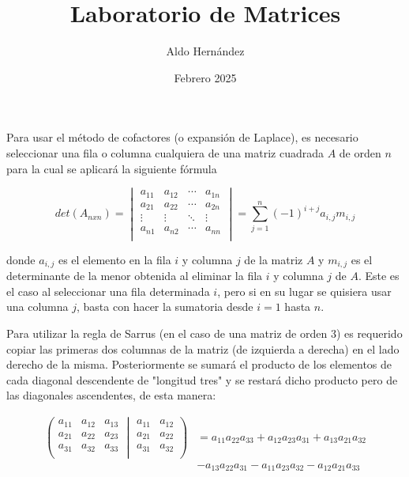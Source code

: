\documentclass[12pt, letterpaper]{article}
\title{Laboratorio de Matrices}
\author{Aldo Hernández}
\date{Febrero 2025}
\begin{document}
\maketitle

Para usar el método de cofactores (o expansión de Laplace), es necesario seleccionar una fila o columna cualquiera de una matriz cuadrada $A$ de orden $n$ para la cual se aplicará la siguiente fórmula

\begin{equation*}
    det(A_{nxn})
    =
    \begin{vmatrix}
        a_{11} & a_{12} & \cdots & a_{1n} \\
        a_{21} & a_{22} & \cdots & a_{2n} \\
        \vdots & \vdots & \ddots & \vdots \\
        a_{n1} & a_{n2} & \cdots & a_{nn} \\
    \end{vmatrix}
    =
    \sum_{j=1}^{n}(-1)^{i+j}a_{i,j}m_{i,j}
\end{equation*}

donde $a_{i,j}$ es el elemento en la fila $i$ y columna $j$ de la matriz $A$ y $m_{i,j}$ es el determinante de la menor obtenida al eliminar la fila $i$ y columna $j$ de $A$. Este es el caso al seleccionar una fila determinada $i$, pero si en su lugar se quisiera usar una columna $j$, basta con hacer la sumatoria desde $i=1$ hasta $n$.

\vspace{5mm}

Para utilizar la regla de Sarrus (en el caso de una matriz de orden 3) es requerido copiar las primeras dos columnas de la matriz (de izquierda a derecha) en el lado derecho de la misma. Posteriormente se sumará el producto de los elementos de cada diagonal descendente de "longitud tres" y se restará dicho producto pero de las diagonales ascendentes, de esta manera:

\begin{equation*}
    \begin{aligned}
        \left(
        \begin{matrix}
            a_{11} & a_{12} & a_{13} \\
            a_{21} & a_{22} & a_{23} \\
            a_{31} & a_{32} & a_{33} \\
        \end{matrix}
        \middle|
        \begin{matrix}
            a_{11} & a_{12} \\
            a_{21} & a_{22} \\
            a_{31} & a_{32} \\
        \end{matrix}
        \right)
        &= a_{11}a_{22}a_{33} + a_{12}a_{23}a_{31} + a_{13}a_{21}a_{32} \\
        & - a_{13}a_{22}a_{31} - a_{11}a_{23}a_{32} - a_{12}a_{21}a_{33}
    \end{aligned}
\end{equation*}
\end{document}
